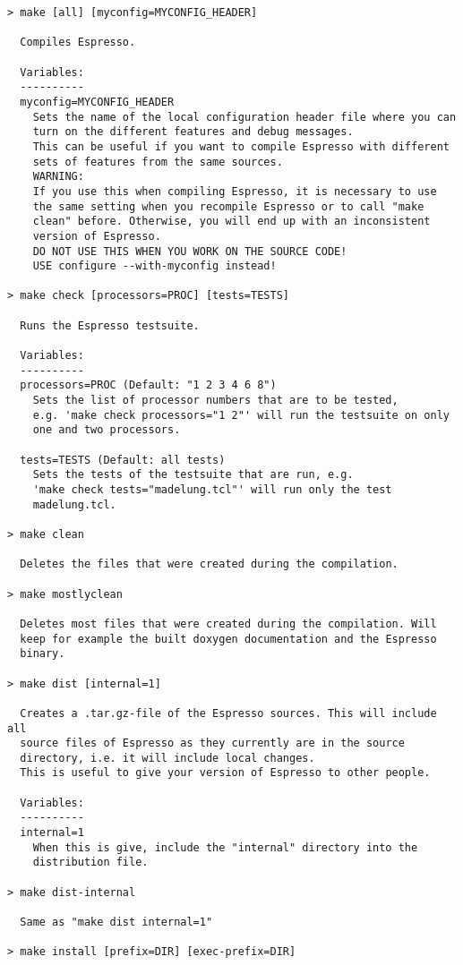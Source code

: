 \begin{verbatim}
> make [all] [myconfig=MYCONFIG_HEADER]

  Compiles Espresso. 

  Variables:
  ----------
  myconfig=MYCONFIG_HEADER
    Sets the name of the local configuration header file where you can
    turn on the different features and debug messages.
    This can be useful if you want to compile Espresso with different
    sets of features from the same sources.
    WARNING:
    If you use this when compiling Espresso, it is necessary to use
    the same setting when you recompile Espresso or to call "make
    clean" before. Otherwise, you will end up with an inconsistent
    version of Espresso.
    DO NOT USE THIS WHEN YOU WORK ON THE SOURCE CODE! 
    USE configure --with-myconfig instead!

> make check [processors=PROC] [tests=TESTS]

  Runs the Espresso testsuite.

  Variables:
  ----------
  processors=PROC (Default: "1 2 3 4 6 8")
    Sets the list of processor numbers that are to be tested,
    e.g. 'make check processors="1 2"' will run the testsuite on only
    one and two processors. 

  tests=TESTS (Default: all tests)
    Sets the tests of the testsuite that are run, e.g. 
    'make check tests="madelung.tcl"' will run only the test
    madelung.tcl.

> make clean

  Deletes the files that were created during the compilation.

> make mostlyclean

  Deletes most files that were created during the compilation. Will
  keep for example the built doxygen documentation and the Espresso
  binary.

> make dist [internal=1]

  Creates a .tar.gz-file of the Espresso sources. This will include all
  source files of Espresso as they currently are in the source
  directory, i.e. it will include local changes.
  This is useful to give your version of Espresso to other people.

  Variables:
  ----------
  internal=1
    When this is give, include the "internal" directory into the
    distribution file.

> make dist-internal

  Same as "make dist internal=1"

> make install [prefix=DIR] [exec-prefix=DIR]


\end{verbatim}

